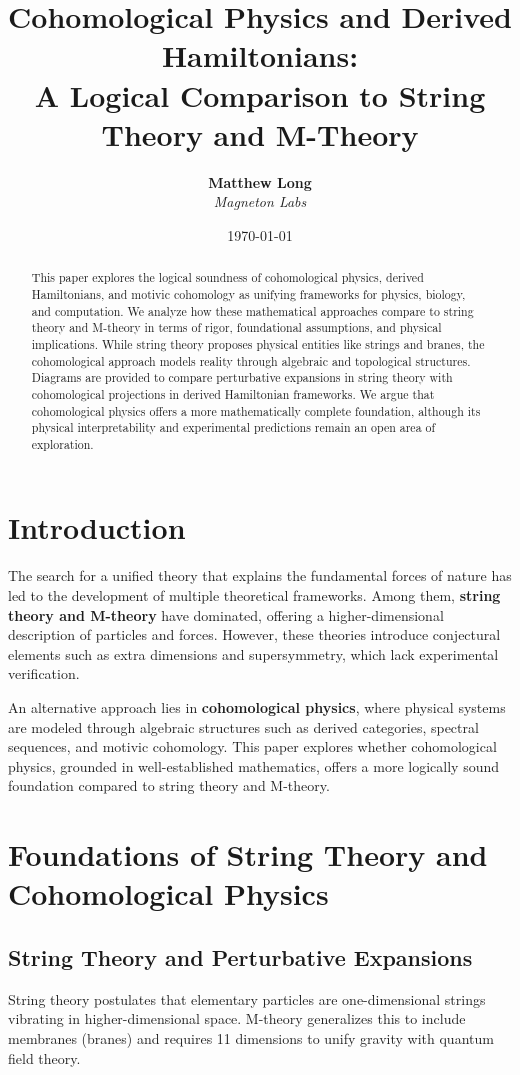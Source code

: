 \documentclass{article}
\title{\textbf{Cohomological Physics and Derived Hamiltonians:}\\
\large{A Logical Comparison to String Theory and M-Theory}}
\author{
  \textbf{Matthew Long}\\
  \textit{Magneton Labs}
}
\date{\today}
\begin{document}
\maketitle

\begin{abstract}
This paper explores the logical soundness of cohomological physics, derived Hamiltonians, and motivic cohomology as unifying frameworks for physics, biology, and computation. We analyze how these mathematical approaches compare to string theory and M-theory in terms of rigor, foundational assumptions, and physical implications. While string theory proposes physical entities like strings and branes, the cohomological approach models reality through algebraic and topological structures. Diagrams are provided to compare perturbative expansions in string theory with cohomological projections in derived Hamiltonian frameworks. We argue that cohomological physics offers a more mathematically complete foundation, although its physical interpretability and experimental predictions remain an open area of exploration. 
\end{abstract}

\section{Introduction}
The search for a unified theory that explains the fundamental forces of nature has led to the development of multiple theoretical frameworks. Among them, \textbf{string theory and M-theory} have dominated, offering a higher-dimensional description of particles and forces. However, these theories introduce conjectural elements such as extra dimensions and supersymmetry, which lack experimental verification.

An alternative approach lies in \textbf{cohomological physics}, where physical systems are modeled through algebraic structures such as derived categories, spectral sequences, and motivic cohomology. This paper explores whether cohomological physics, grounded in well-established mathematics, offers a more logically sound foundation compared to string theory and M-theory.

\section{Foundations of String Theory and Cohomological Physics}
\subsection{String Theory and Perturbative Expansions}
String theory postulates that elementary particles are one-dimensional strings vibrating in higher-dimensional space. M-theory generalizes this to include membranes (branes) and requires 11 dimensions to unify gravity with quantum field theory.
\end{document}
